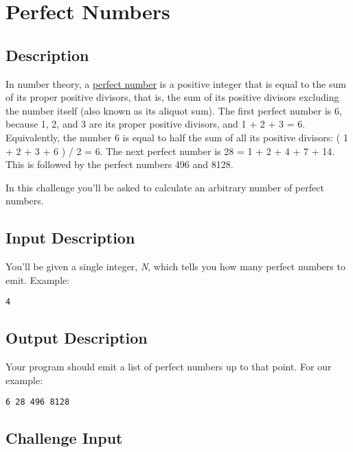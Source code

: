 \section{Perfect Numbers}

\subsection*{Description}\label{description-35}

In number theory, a
\href{http://en.wikipedia.org/wiki/Perfect_number}{perfect number} is a
positive integer that is equal to the sum of its proper positive
divisors, that is, the sum of its positive divisors excluding the number
itself (also known as its aliquot sum). The first perfect number is 6,
because 1, 2, and 3 are its proper positive divisors, and 1 + 2 + 3 = 6.
Equivalently, the number 6 is equal to half the sum of all its positive
divisors: ( 1 + 2 + 3 + 6 ) / 2 = 6. The next perfect number is 28 = 1 +
2 + 4 + 7 + 14. This is followed by the perfect numbers 496 and 8128.

In this challenge you'll be asked to calculate an arbitrary number of
perfect numbers.

\subsection*{Input Description}\label{input-description-24}

You'll be given a single integer, \emph{N}, which tells you how many
perfect numbers to emit. Example:

\begin{lstlisting}
4
\end{lstlisting}

\subsection*{Output Description}\label{output-description-26}

Your program should emit a list of perfect numbers up to that point. For
our example:

\begin{lstlisting}
6 28 496 8128
\end{lstlisting}

\subsection*{Challenge Input}\label{challenge-input-29}

